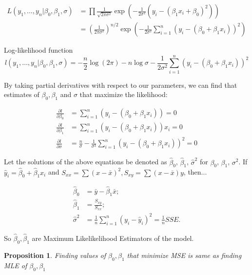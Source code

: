 \documentclass[12pt,a4paper,oneside]{book} %
\newtheorem{proposition}[theorem]{Proposition}
\begin{document}
\begin{align}
	L(y_1, \ldots, y_n | \beta_0, \beta_1, \sigma) &= \prod \frac{1}{\sqrt{2 \pi \sigma^2}} \exp (-\frac{1}{2\sigma^2}(y_i-(\beta_1 x_i + \beta_0)^2))\\
	&= \left( \frac{1}{2\pi\sigma^2} \right)^{n/2} \exp\left( -\frac{1}{2\sigma^2} \sum_{i=1}^{n} (y_i - (\beta_0 + \beta_1 x_i))^2 \right)
\end{align}


Log-likelihood function
\begin{equation} \label{eq:loglikelihood}
	l(y_1, \ldots, y_n | \beta_0, \beta_1, \sigma) = -\frac{n}{2} \log (2 \pi) - n \log \sigma - \frac{1}{2\sigma^2} \sum_{i=1}^{n} (y_i - (\beta_0 + \beta_1 x_i))^2
\end{equation}

By taking partial derivatives with respect to our parameters, we can find that estimates of $\beta_0, \beta_1$ and $\sigma$ that maximize the likelihood:

\begin{align}
	\frac{\partial l}{\partial \beta_0} &= \sum_{i=1}^{n} (y_i - (\beta_0 + \beta_1 x_i)) = 0 \label{eq:est_beta_0} \\
	\frac{\partial l}{\partial \beta_1} &= \sum_{i=1}^{n} (y_i - (\beta_0 + \beta_1 x_i))x_i = 0 \label{eq:est_beta_1} \\
	\frac{\partial l}{\partial \sigma} &= \frac{n}{\sigma} - \frac{1}{\sigma^3} \sum_{i=1}^{n} (y_i - (\beta_0 + \beta_1 x_i))^2 = 0 
\end{align}
	

Let the solutions of the above equations be denoted as $\hat{\beta}_0$, $\hat{\beta}_1$, $\hat{\sigma}^2$ for $\beta_0$, $\beta_1$, $\sigma^2$. If $\hat{y}_i = \hat{\beta}_0 + \hat{\beta}_1 x_i$ and $S_{xx}= \sum (x-\bar{x})^2, S_{xy}=\sum (x-\bar{x})y$, then...

\begin{align}
\hat{\beta}_0  &= \bar{y} - \hat{\beta}_1 \bar{x}; \label{est:intercept} \\
\hat{\beta}_1 &= \frac{S_{xy}}{S_{xx}}; \label{est:slope}\\
\hat{\sigma}^2 &= \frac{1}{n} \sum_{i=1}^{n} (y_i - \hat{y}_i)^2 = \frac{1}{n} SSE.
\end{align}

So $\hat{\beta}_0, \hat{\beta}_1$ are Maximum Likelikelihood Estimators of the model.

\begin{proposition}
	Finding values of $\beta_0, \beta_1 $ that minimize MSE is same as finding MLE of $\beta_0 ,\beta_1 $
\end{proposition}
\end{document}

